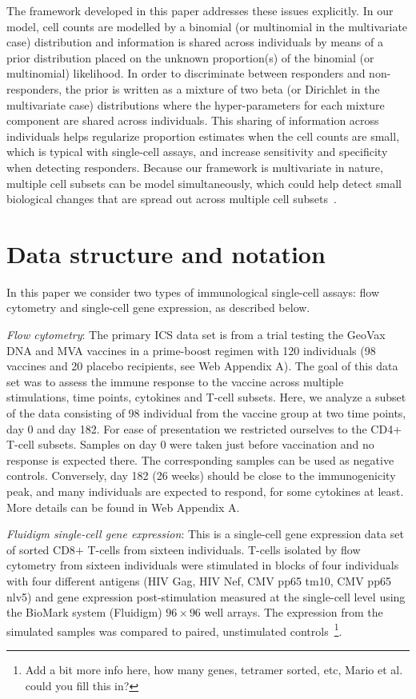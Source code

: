 \documentclass[useAMS,referee,usenatbib]{biom}
\begin{document}
The framework developed in this paper addresses these issues explicitly. In our model, cell counts are modelled by a binomial (or multinomial in the multivariate case) distribution and information is shared across individuals by means of a prior distribution placed on the unknown proportion(s) of the binomial (or multinomial) likelihood. 
In order to discriminate between responders and non-responders, the prior is written as a mixture of two beta (or Dirichlet in the multivariate case) distributions where the hyper-parameters for each mixture component are shared across individuals. 
This sharing of information across individuals helps regularize proportion estimates when the cell counts are small, which is typical with single-cell assays, and increase sensitivity and specificity when detecting responders. 
Because our framework is multivariate in nature, multiple cell subsets can be model simultaneously, which could help detect small biological changes that are spread out across multiple cell subsets~\citep{Nason:2006dx}.

\section{Data structure and notation} 
\label{s:data}
In this paper we consider two types of immunological single-cell assays: flow cytometry and single-cell gene expression, as described below.

\textit{Flow cytometry}:
The primary ICS data set is from a  trial testing the GeoVax DNA and MVA vaccines in a prime-boost regimen with 120 individuals (98 vaccines and 20 placebo recipients, see Web Appendix A). 
The goal of this data set was to assess the immune response to the vaccine across multiple stimulations, time points, cytokines and T-cell subsets. 
Here, we analyze a subset of the data consisting of 98 individual from the vaccine group at two time points, day 0 and day 182. For ease of presentation we restricted ourselves to the CD4+ T-cell subsets. Samples on day 0 were taken just before vaccination and no response is expected there. The corresponding samples can be used as negative controls. 
Conversely, day 182 (26 weeks) should be close to the immunogenicity peak, and many individuals are expected to respond, for some cytokines at least. More details can be found in Web Appendix A.

\textit{Fluidigm single-cell gene expression}: This is a single-cell gene expression data set of sorted CD8$+$ T-cells from sixteen individuals. T-cells isolated by flow cytometry from sixteen individuals were stimulated in blocks of four individuals with four different antigens (HIV Gag, HIV Nef, CMV pp65 tm10, CMV pp65 nlv5) and gene expression post-stimulation measured at the single-cell level using the BioMark system (Fluidigm) $96 \times 96$ well arrays. The expression from the simulated samples  was compared to paired, unstimulated controls~\footnote{Add a bit more info here, how many genes, tetramer sorted, etc, Mario et al. could you fill this in?}.
\end{document}
